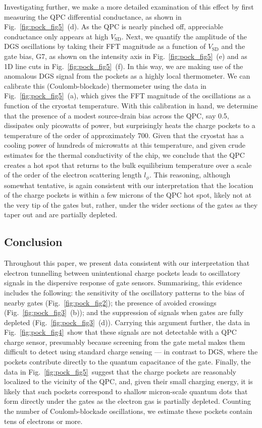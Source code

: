 Investigating further, we make a more detailed examination of this effect by first measuring the QPC differential conductance, as shown in Fig.~\ref{fig:pock_fig5}~(d). As the QPC is nearly pinched off, appreciable conductance only appears at high $V_{\textrm{SD}}$. Next, we quantify the amplitude of the DGS oscillations by taking their FFT magnitude as a function of $V_{\textrm{SD}}$ and the gate bias, G7, as shown on the intensity axis in Fig.~\ref{fig:pock_fig5}~(e) and as 1D line cuts in Fig.~\ref{fig:pock_fig5}~(f). In this way, we are making use of the anomalous DGS signal from the pockets as a highly local thermometer. We can calibrate this (Coulomb-blockade) thermometer using the data in Fig.~\ref{fig:pock_fig5}~(a), which gives the FFT magnitude of the oscillations as a function of the cryostat temperature. With this calibration in hand, we determine that the presence of a modest source-drain bias across the QPC, say \SI{0.5}{\mv}, dissipates only picowatts of power, but surprisingly heats the charge pockets to a temperature of the order of approximately \SI{700}{\mk}. Given that the cryostat has a cooling power of hundreds of microwatts at this temperature, and given crude estimates for the thermal conductivity of the chip, we conclude that the QPC creates a hot spot that returns to the bulk equilibrium temperature over a scale of the order of the electron scattering length $l_\phi$. This reasoning, although somewhat tentative, is again consistent with our interpretation that the location of the charge pockets is within a few microns of the QPC hot spot, likely not at the very tip of the gates but, rather, under the wider sections of the gates as they taper out and are partially depleted.

\subsection{Conclusion}
Throughout this paper, we present data consistent with our interpretation that electron tunnelling between unintentional charge pockets leads to oscillatory signals in the dispersive response of gate sensors. Summarising, this evidence includes the following: the sensitivity of the oscillatory patterns to the bias of nearby gates (Fig.~\ref{fig:pock_fig2}); the presence of avoided crossings (Fig.~\ref{fig:pock_fig3}~(b)); and the suppression of signals when gates are fully depleted (Fig.~\ref{fig:pock_fig3}~(d)). Carrying this argument further, the data in Fig.~\ref{fig:pock_fig4}~show that these signals are not detectable with a QPC charge sensor, presumably because screening from the gate metal makes them difficult to detect using standard charge sensing --- in contrast to DGS, where the pockets contribute directly to the quantum capacitance of the gate. Finally,  the data in Fig.~\ref{fig:pock_fig5}~suggest that the charge pockets are reasonably localized to the vicinity of the QPC, and, given their small charging energy, it is likely that such pockets correspond to shallow micron-scale quantum dots that form directly under the gates as the electron gas is partially depleted. Counting the number of Coulomb-blockade oscillations, we estimate these pockets contain tens of electrons or more.

